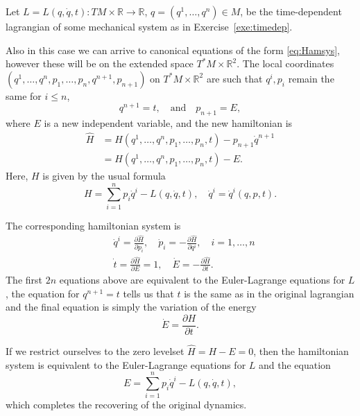 \documentclass[english,fontsize=11pt,paper=b5]{scrbook}
\theoremstyle{definition}
\begin{document}
    Let $L=L(q,\dot q,t): TM\times\mathbb{R}\to\mathbb{R}$, $q=(q^1,\ldots,q^n)\in M$, be the time-dependent lagrangian of some mechanical system as in Exercise~\ref{exe:timedep}.

    Also in this case we can arrive to canonical equations of the form \eqref{eq:Hamsys}, however these will be on the extended space $T^*M\times\mathbb{R}^2$. The local coordinates $(q^1,\ldots,q^n, p_1, \ldots,p_n, q^{n+1}, p_{n+1})$ on $T^*M\times\mathbb{R}^2$ are such that $q^i, p_i$ remain the same for $i\leq n$,
    \begin{equation}
      q^{n+1} = t, \quad\mbox{and}\quad
      p_{n+1} = E,
    \end{equation}
    where $E$ is a new independent variable, and the new hamiltonian is
    \begin{align}
      \hat H & = H(q^1, \ldots, q^n, p_1, \ldots, p_n, t) - p_{n+1}\dot q^{n+1} \\
             & = H(q^1, \ldots, q^n, p_1, \ldots, p_n, t) - E.
    \end{align}
    Here, $H$ is given by the usual formula
    \begin{equation}
      H = \sum_{i=1}^n p_i \dot q^i - L(q, \dot q, t), \quad \dot q^i = \dot q^i(q,p,t).
    \end{equation}

    The corresponding hamiltonian system is
    \begin{align}
   & \dot q^i = \frac{\partial \hat H}{\partial p_i}, \quad
   \dot p_i = -\frac{\partial \hat H}{\partial q^i}, \quad
   i=1,\ldots,n                                                                                              \\
   & \dot t = \frac{\partial \hat H}{\partial E} = 1, \quad {\dot E} = -\frac{\partial \hat H}{\partial t}.
    \end{align}
    The first $2n$ equations above are equivalent to the Euler-Lagrange equations for $L$, the equation for $q^{n+1} = t$ tells us that $t$ is the same as in the original lagrangian and the final equation is simply the variation of the energy
    \begin{equation}
      \dot E = \frac{\partial H}{\partial t}.
    \end{equation}

    If we restrict ourselves to the zero levelset $\hat H = H - E = 0$, then the hamiltonian system is equivalent to the Euler-Lagrange equations for $L$ and the equation
    \begin{equation}
      E = \sum_{i=1}^n p_i \dot q^i - L(q, \dot q, t),
    \end{equation}
    which completes the recovering of the original dynamics.
\end{document}
